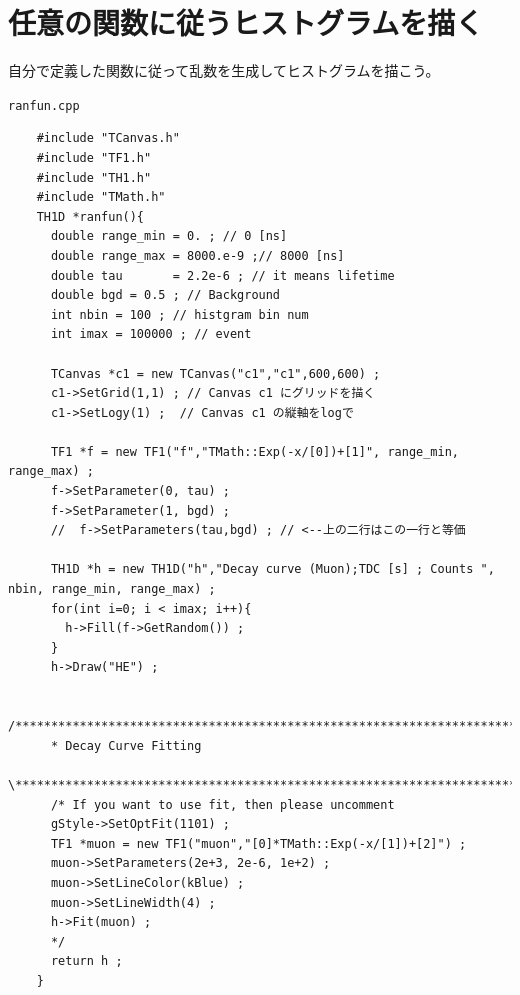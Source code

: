\clearpage
 \section{任意の関数に従うヒストグラムを描く}
 自分で定義した関数に従って乱数を生成してヒストグラムを描こう。
 \begin{itembox}{\texttt{ranfun.cpp}}
\begin{verbatim}
	#include "TCanvas.h"
	#include "TF1.h"
	#include "TH1.h"
	#include "TMath.h"
	TH1D *ranfun(){
	  double range_min = 0. ; // 0 [ns]
	  double range_max = 8000.e-9 ;// 8000 [ns]
	  double tau       = 2.2e-6 ; // it means lifetime
	  double bgd = 0.5 ; // Background
	  int nbin = 100 ; // histgram bin num
	  int imax = 100000 ; // event

	  TCanvas *c1 = new TCanvas("c1","c1",600,600) ;
	  c1->SetGrid(1,1) ; // Canvas c1 にグリッドを描く
	  c1->SetLogy(1) ;  // Canvas c1 の縦軸をlogで

	  TF1 *f = new TF1("f","TMath::Exp(-x/[0])+[1]", range_min, range_max) ;
	  f->SetParameter(0, tau) ;
	  f->SetParameter(1, bgd) ;
	  //  f->SetParameters(tau,bgd) ; // <--上の二行はこの一行と等価

	  TH1D *h = new TH1D("h","Decay curve (Muon);TDC [s] ; Counts ", nbin, range_min, range_max) ;
	  for(int i=0; i < imax; i++){
	    h->Fill(f->GetRandom()) ;
	  }
	  h->Draw("HE") ;

	  /********************************************************************************\
	  * Decay Curve Fitting
	  \********************************************************************************/
	  /* If you want to use fit, then please uncomment
	  gStyle->SetOptFit(1101) ;
	  TF1 *muon = new TF1("muon","[0]*TMath::Exp(-x/[1])+[2]") ;
	  muon->SetParameters(2e+3, 2e-6, 1e+2) ;
	  muon->SetLineColor(kBlue) ;
	  muon->SetLineWidth(4) ;
	  h->Fit(muon) ;
	  */
	  return h ;
	}
\end{verbatim}
 \end{itembox}

